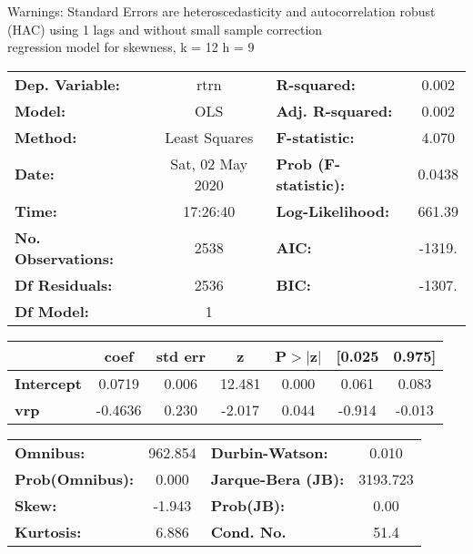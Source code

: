 Warnings: \newline
 [1] Standard Errors are heteroscedasticity and autocorrelation robust (HAC) using 1 lags and without small sample correction\\ 

regression model for skewness, k = 12 h = 9\begin{center}
\begin{tabular}{lclc}
\toprule
\textbf{Dep. Variable:}    &       rtrn       & \textbf{  R-squared:         } &     0.002   \\
\textbf{Model:}            &       OLS        & \textbf{  Adj. R-squared:    } &     0.002   \\
\textbf{Method:}           &  Least Squares   & \textbf{  F-statistic:       } &     4.070   \\
\textbf{Date:}             & Sat, 02 May 2020 & \textbf{  Prob (F-statistic):} &   0.0438    \\
\textbf{Time:}             &     17:26:40     & \textbf{  Log-Likelihood:    } &    661.39   \\
\textbf{No. Observations:} &        2538      & \textbf{  AIC:               } &    -1319.   \\
\textbf{Df Residuals:}     &        2536      & \textbf{  BIC:               } &    -1307.   \\
\textbf{Df Model:}         &           1      & \textbf{                     } &             \\
\bottomrule
\end{tabular}
\begin{tabular}{lcccccc}
                   & \textbf{coef} & \textbf{std err} & \textbf{z} & \textbf{P$> |$z$|$} & \textbf{[0.025} & \textbf{0.975]}  \\
\midrule
\textbf{Intercept} &       0.0719  &        0.006     &    12.481  &         0.000        &        0.061    &        0.083     \\
\textbf{vrp}       &      -0.4636  &        0.230     &    -2.017  &         0.044        &       -0.914    &       -0.013     \\
\bottomrule
\end{tabular}
\begin{tabular}{lclc}
\textbf{Omnibus:}       & 962.854 & \textbf{  Durbin-Watson:     } &    0.010  \\
\textbf{Prob(Omnibus):} &   0.000 & \textbf{  Jarque-Bera (JB):  } & 3193.723  \\
\textbf{Skew:}          &  -1.943 & \textbf{  Prob(JB):          } &     0.00  \\
\textbf{Kurtosis:}      &   6.886 & \textbf{  Cond. No.          } &     51.4  \\
\bottomrule
\end{tabular}
\end{center}

